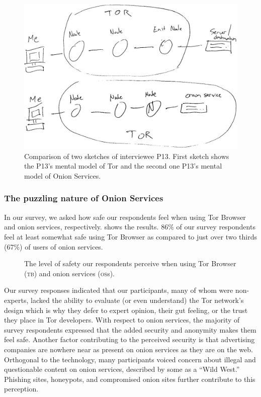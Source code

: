 \begin{figure}[!ht]
        \centering
        \includegraphics[width=0.8\linewidth]{paper/figures/P13bothSketches.jpg}
        \caption{Comparison of two sketches of interviewee P13. First sketch shows the P13’s mental model of Tor and the second one P13’s mental model of Onion Services. }
        \label{fig:toros-sketch}
\end{figure}




\subsubsection{The puzzling nature of Onion Services}
In our survey, we asked how safe our
respondents feel when using Tor Browser and onion services, respectively.
 shows the results.  
86\% of our survey respondents feel at least somewhat safe using Tor Browser as compared to just over two thirds (67\%) of users of onion services.

\begin{figure}[t]
    \centering
    
    \caption{The level of safety our respondents perceive when using Tor
    Browser (\textsc{tb}) and onion services (\textsc{os}s).}
    \label{fig:perceived-security}
\end{figure}

Our survey responses indicated that our participants, many of whom were non-experts,  lacked the ability to evaluate (or even understand) the
Tor network's design which is why they defer to expert opinion, their gut
feeling, or the trust they place in Tor developers.  With respect to onion
services, the majority of survey respondents expressed that the added security and anonymity makes
them feel safe.  Another factor contributing to the perceived security is that
advertising companies are nowhere near as present on onion services as they are
on the web.  Orthogonal to the technology, many participants voiced concern
about illegal and questionable content on onion services, described by some as a
``Wild West.'' Phishing sites, honeypots, and compromised onion sites further
contribute to this perception.


